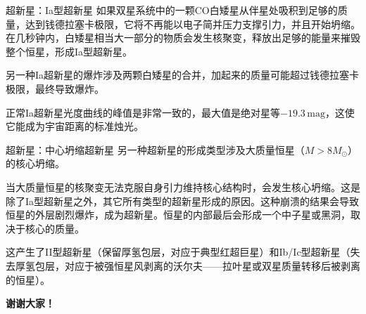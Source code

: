 \documentclass[10pt,aspectratio=1610]{beamer}
\begin{document}
\begin{frame}{超新星：Ia型超新星}
    \textcolor{mari}{如果双星系统中的一颗CO白矮星从伴星处吸积到足够的质量，达到钱德拉塞卡极限，它将不再能以电子简并压力支撑引力，并且开始坍缩。}在几秒钟内，白矮星相当大一部分的物质会发生核聚变，释放出足够的能量来摧毁整个恒星，形成\textcolor{dia}{Ia型超新星}。

    另一种Ia超新星的爆炸涉及两颗白矮星的合并，加起来的质量可能超过钱德拉塞卡极限，最终导致爆炸。

    正常Ia超新星光度曲线的峰值是非常一致的，最大值是\textcolor{mari}{绝对星等$-19.3\,\mathrm{mag}$}，这使它能成为宇宙距离的\textcolor{dia}{标准烛光}。
\end{frame}

\begin{frame}{超新星：中心坍缩超新星}
    另一种超新星的形成类型涉及大质量恒星（$M > 8 M_\odot$）的核心坍缩。

    \textcolor{mari}{当大质量恒星的核聚变无法克服自身引力维持核心结构时，会发生核心坍缩。}这是除了Ia型超新星之外，其它所有类型的超新星形成的原因。这种崩溃的结果会导致恒星的外层剧烈爆炸，成为超新星。恒星的内部最后会形成一个中子星或黑洞，取决于核心的质量。

    这产生了\textcolor{dia}{II型超新星}（保留厚氢包层，对应于典型红超巨星）和\textcolor{dia}{Ib/Ic型超新星}（失去厚氢包层，对应于被强恒星风剥离的沃尔夫——拉叶星或双星质量转移后被剥离的恒星）。
\end{frame}

\begin{frame}[plain]
    \begin{center}
        \huge
        \textbf{谢谢大家！}
    \end{center}
\end{frame}
\end{document}
